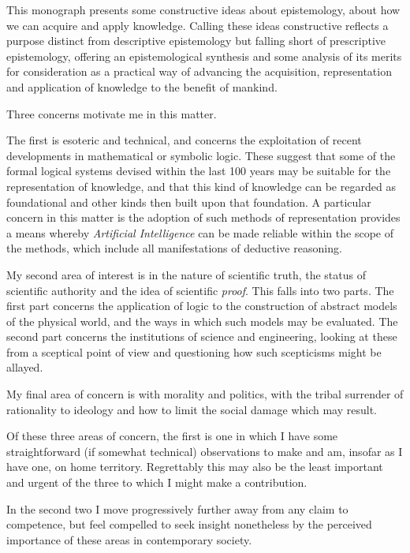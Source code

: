 ﻿This monograph presents some constructive ideas about epistemology, about how we can acquire and apply knowledge.
Calling these ideas constructive reflects a purpose distinct from descriptive epistemology but falling short of prescriptive epistemology, offering an epistemological synthesis and some analysis of its merits for consideration as a practical way of advancing the acquisition, representation and application of knowledge to the benefit of mankind.

Three concerns motivate me in this matter.

The first is esoteric and technical, and concerns the exploitation of recent developments in mathematical or symbolic logic.
These suggest that some of the formal logical systems devised within the last 100 years may be suitable for the representation of knowledge, and that this kind of knowledge can be regarded as foundational and other kinds then built upon that foundation.
A particular concern in this matter is the adoption of such methods of representation provides a means whereby \emph{Artificial Intelligence} can be made reliable within the scope of the methods, which include all manifestations of deductive reasoning.

My second area of interest is in the nature of scientific truth, the status of scientific authority and the idea of scientific \emph{proof}.
This falls into two parts.
The first part concerns the application of logic to the construction of abstract models of the physical world, and the ways in which such models may be evaluated.
The second part concerns the institutions of science and engineering, looking at these from a sceptical point of view and questioning how such scepticisms might be allayed.

My final area of concern is with morality and politics, with the tribal surrender of rationality to ideology and how to limit the social damage which may result.

Of these three areas of concern, the first is one in which I have some straightforward (if somewhat technical) observations to make and am, insofar as I have one, on home territory.
Regrettably this may also be the least important and urgent of the three to which I might make a contribution.

In the second two I move progressively further away from any claim to competence, but feel compelled to seek insight nonetheless by the perceived importance of these areas in contemporary society.

